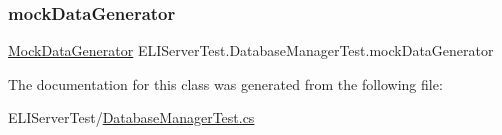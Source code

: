\subsubsection{\texorpdfstring{mock\+Data\+Generator}{mockDataGenerator}}
{\footnotesize\ttfamily \hyperlink{class_e_l_i_server_test_1_1_mock_data_generator}{Mock\+Data\+Generator} E\+L\+I\+Server\+Test.\+Database\+Manager\+Test.\+mock\+Data\+Generator\hspace{0.3cm}{\ttfamily [private]}}



The documentation for this class was generated from the following file\+:\begin{DoxyCompactItemize}
\item 
E\+L\+I\+Server\+Test/\hyperlink{_database_manager_test_8cs}{Database\+Manager\+Test.\+cs}\end{DoxyCompactItemize}
